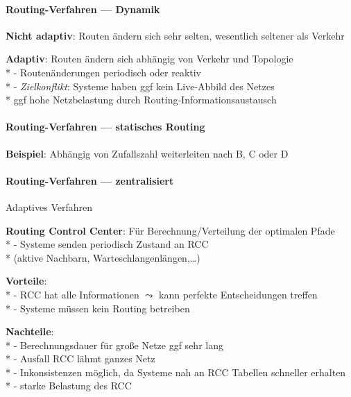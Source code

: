 \paragraph{Routing-Verfahren --- Dynamik}
\begin{items}
  \item \textbf{Nicht adaptiv}: Routen ändern sich sehr selten, wesentlich seltener als Verkehr
  \item \textbf{Adaptiv}: Routen ändern sich abhängig von Verkehr und Topologie \\*
    - Routenänderungen periodisch oder reaktiv \\*
    - \emph{Zielkonflikt}: Systeme haben ggf kein Live-Abbild des Netzes \\*
      \phantom{-} \phantom{\( \cdot \)} ggf hohe Netzbelastung durch Routing-Informationsaustausch
\end{items}

\paragraph{Routing-Verfahren --- statisches Routing}
\begin{items}
  \item \textbf{Beispiel}: Abhängig von Zufallszahl weiterleiten nach B, C oder D
\end{items}

\paragraph{Routing-Verfahren --- zentralisiert}
\begin{items}
  \item Adaptives Verfahren
  \item \textbf{Routing Control Center}: Für Berechnung/Verteilung der optimalen Pfade \\*
    - Systeme senden periodisch Zustand an RCC \\* \phantom{-} \phantom{\( \cdot \)} (aktive Nachbarn, Warteschlangenlängen,\dots)
  \item \textbf{Vorteile}: \\*
    - RCC hat alle Informationen \( \leadsto \) kann perfekte Entscheidungen treffen \\*
    - Systeme müssen kein Routing betreiben
  \item \textbf{Nachteile}: \\*
    - Berechnungsdauer für große Netze ggf sehr lang \\*
    - Ausfall RCC lähmt ganzes Netz \\*
    - Inkonsistenzen möglich, da Systeme nah an RCC Tabellen schneller erhalten \\*
    - starke Belastung des RCC
\end{items}

